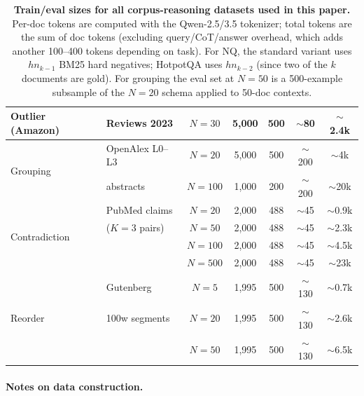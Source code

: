 \begin{table}[htbp]
\begin{tabular}{l l c c c c c}
\midrule
Outlier (Amazon)               & Reviews 2023    & $N{=}30$  & 5{,}000 & 500 & $\sim$80  & $\sim$2.4k \\
\midrule
\multirow{2}{*}{Grouping}      & OpenAlex L0--L3 & $N{=}20$  & 5{,}000 & 500 & $\sim$200 & $\sim$4k   \\
                               & abstracts       & $N{=}100$ & 1{,}000 & 200 & $\sim$200 & $\sim$20k  \\
\midrule
\multirow{4}{*}{Contradiction} & PubMed claims   & $N{=}20$  & 2{,}000 & 488 & $\sim$45  & $\sim$0.9k \\
                               & ($K{=}3$ pairs) & $N{=}50$  & 2{,}000 & 488 & $\sim$45  & $\sim$2.3k \\
                               &                 & $N{=}100$ & 2{,}000 & 488 & $\sim$45  & $\sim$4.5k \\
                               &                 & $N{=}500$ & 2{,}000 & 488 & $\sim$45  & $\sim$23k  \\
\midrule
\multirow{3}{*}{Reorder}       & Gutenberg       & $N{=}5$   & 1{,}995 & 500 & $\sim$130 & $\sim$0.7k \\
                               & 100w segments   & $N{=}20$  & 1{,}995 & 500 & $\sim$130 & $\sim$2.6k \\
                               &                 & $N{=}50$  & 1{,}995 & 500 & $\sim$130 & $\sim$6.5k \\
\bottomrule
\end{tabular}
\caption{\textbf{Train/eval sizes for all corpus-reasoning datasets used in this paper.} Per-doc tokens are computed with the Qwen-2.5/3.5 tokenizer; total tokens are the sum of doc tokens (excluding query/CoT/answer overhead, which adds another 100--400 tokens depending on task). For NQ, the standard variant uses $hn_{k-1}$ BM25 hard negatives; HotpotQA uses $hn_{k-2}$ (since two of the $k$ documents are gold). For grouping the eval set at $N{=}50$ is a 500-example subsample of the $N{=}20$ schema applied to 50-doc contexts.}
\label{tab:data-stats}
\end{table}
\fi

\paragraph{Notes on data construction.}

